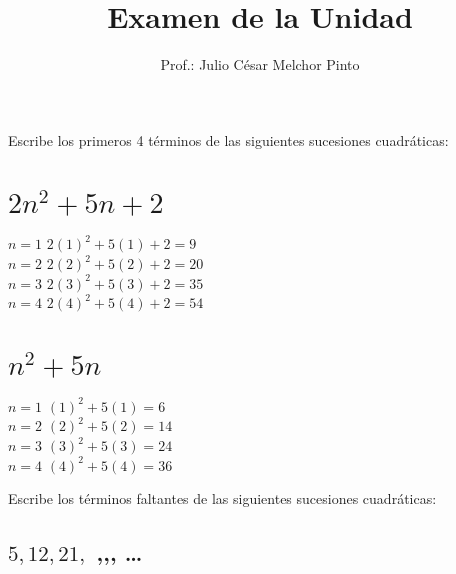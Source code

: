 \documentclass[12pt,addpoints]{evalua}
\title{Examen de la Unidad}
\author{Prof.: Julio César Melchor Pinto}
\begin{document}
%
\begin{multicols}{2}
    
    
\end{multicols}
\begin{questions}\large
    \question[10] Escribe los primeros 4 términos de las siguientes sucesiones cuadráticas:

    \begin{multicols}{2}
        \begin{parts}
            \part { \Large$2n^2+5n+2$} \hfill \fillin[$9,20,35,54$][0cm]

            \begin{solutionbox}{4cm}
                $n=1$ \quad $2(1)^2+5(1)+2=9$ \\
                $n=2$ \quad $2(2)^2+5(2)+2=20$ \\
                $n=3$ \quad $2(3)^2+5(3)+2=35$ \\
                $n=4$ \quad $2(4)^2+5(4)+2=54$
            \end{solutionbox}

            \part {\Large $n^2+5n$} \hfill \fillin[$6,14,24,36$][0cm]

            \begin{solutionbox}{4cm}
                $n=1$ \quad $(1)^2+5(1)=6$ \\
                $n=2$ \quad $(2)^2+5(2)=14$ \\
                $n=3$ \quad $(3)^2+5(3)=24$ \\
                $n=4$ \quad $(4)^2+5(4)=36$
            \end{solutionbox}
        \end{parts}
    \end{multicols}

    \question[10] Escribe los términos faltantes de las siguientes sucesiones cuadráticas:

    \begin{multicols}{2}
        \begin{parts}
            \part { \Large$5,12,21,$ \fillin[32][0.5cm],\fillin[45][0.5cm],\fillin[60][0.5cm], \dots}


\end{parts}
\end{multicols}
\end{questions}
\end{document}
